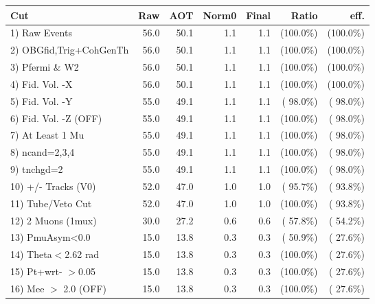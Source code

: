  \begin{table}[h!]\centering
 \begin{tabular}{||l||r|r|r|r|r|r||}
 \hline
 \hline
 Cut & Raw & AOT & Norm0 & Final & Ratio & eff.       \\
 \hline
  1) Raw Events           &         56.0 &         50.1 &          1.1 &          1.1 & (100.0\%) & (100.0\%) \\
  2) OBGfid,Trig+CohGenTh &         56.0 &         50.1 &          1.1 &          1.1 & (100.0\%) & (100.0\%) \\
  3) Pfermi \& W2         &         56.0 &         50.1 &          1.1 &          1.1 & (100.0\%) & (100.0\%) \\
  4) Fid. Vol. -X         &         56.0 &         50.1 &          1.1 &          1.1 & (100.0\%) & (100.0\%) \\
  5) Fid. Vol. -Y         &         55.0 &         49.1 &          1.1 &          1.1 & ( 98.0\%) & ( 98.0\%) \\
  6) Fid. Vol. -Z (OFF)   &         55.0 &         49.1 &          1.1 &          1.1 & (100.0\%) & ( 98.0\%) \\
  7) At Least 1 Mu        &         55.0 &         49.1 &          1.1 &          1.1 & (100.0\%) & ( 98.0\%) \\
  8) ncand=2,3,4          &         55.0 &         49.1 &          1.1 &          1.1 & (100.0\%) & ( 98.0\%) \\
  9) tnchgd=2             &         55.0 &         49.1 &          1.1 &          1.1 & (100.0\%) & ( 98.0\%) \\
 10) +/- Tracks (V0)      &         52.0 &         47.0 &          1.0 &          1.0 & ( 95.7\%) & ( 93.8\%) \\
 11) Tube/Veto Cut        &         52.0 &         47.0 &          1.0 &          1.0 & (100.0\%) & ( 93.8\%) \\
 12) 2 Muons (1mux)       &         30.0 &         27.2 &          0.6 &          0.6 & ( 57.8\%) & ( 54.2\%) \\
 13) PmuAsym<0.0          &         15.0 &         13.8 &          0.3 &          0.3 & ( 50.9\%) & ( 27.6\%) \\
 14) Theta$<$2.62 rad     &         15.0 &         13.8 &          0.3 &          0.3 & (100.0\%) & ( 27.6\%) \\
 15) Pt+wrt- $>$0.05      &         15.0 &         13.8 &          0.3 &          0.3 & (100.0\%) & ( 27.6\%) \\
 16) Mee $>$ 2.0  (OFF)   &         15.0 &         13.8 &          0.3 &          0.3 & (100.0\%) & ( 27.6\%) \\

\end{tabular}
\end{table}

